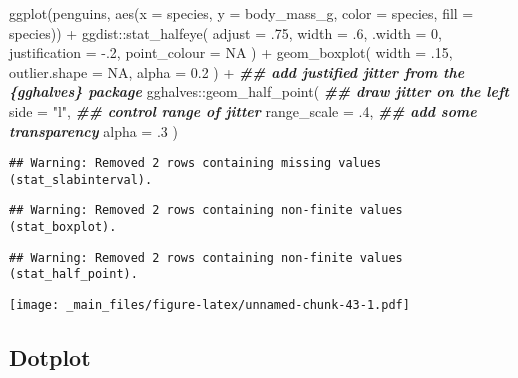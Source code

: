 \documentclass[
]{book}
\newenvironment{Shaded}{\begin{snugshade}}{\end{snugshade}}
\newcommand{\AttributeTok}[1]{\textcolor[rgb]{0.77,0.63,0.00}{#1}}
\newcommand{\ConstantTok}[1]{\textcolor[rgb]{0.00,0.00,0.00}{#1}}
\newcommand{\DecValTok}[1]{\textcolor[rgb]{0.00,0.00,0.81}{#1}}
\newcommand{\DocumentationTok}[1]{\textcolor[rgb]{0.56,0.35,0.01}{\textbf{\textit{#1}}}}
\newcommand{\FloatTok}[1]{\textcolor[rgb]{0.00,0.00,0.81}{#1}}
\newcommand{\FunctionTok}[1]{\textcolor[rgb]{0.00,0.00,0.00}{#1}}
\newcommand{\NormalTok}[1]{#1}
\newcommand{\SpecialCharTok}[1]{\textcolor[rgb]{0.00,0.00,0.00}{#1}}
\newcommand{\StringTok}[1]{\textcolor[rgb]{0.31,0.60,0.02}{#1}}
\begin{document}
\begin{Shaded}
\begin{Highlighting}[]
\FunctionTok{ggplot}\NormalTok{(penguins, }\FunctionTok{aes}\NormalTok{(}\AttributeTok{x =}\NormalTok{ species, }\AttributeTok{y =}\NormalTok{ body\_mass\_g, }\AttributeTok{color =}\NormalTok{ species, }\AttributeTok{fill =}\NormalTok{ species)) }\SpecialCharTok{+} 
\NormalTok{  ggdist}\SpecialCharTok{::}\FunctionTok{stat\_halfeye}\NormalTok{(}
    \AttributeTok{adjust =}\NormalTok{ .}\DecValTok{75}\NormalTok{, }
    \AttributeTok{width =}\NormalTok{ .}\DecValTok{6}\NormalTok{, }
    \AttributeTok{.width =} \DecValTok{0}\NormalTok{, }
    \AttributeTok{justification =} \SpecialCharTok{{-}}\NormalTok{.}\DecValTok{2}\NormalTok{, }
    \AttributeTok{point\_colour =} \ConstantTok{NA}
\NormalTok{  ) }\SpecialCharTok{+} 
  \FunctionTok{geom\_boxplot}\NormalTok{(}
    \AttributeTok{width =}\NormalTok{ .}\DecValTok{15}\NormalTok{, }
    \AttributeTok{outlier.shape =} \ConstantTok{NA}\NormalTok{,}
    \AttributeTok{alpha =} \FloatTok{0.2}
\NormalTok{  ) }\SpecialCharTok{+}
  \DocumentationTok{\#\# add justified jitter from the \{gghalves\} package}
\NormalTok{  gghalves}\SpecialCharTok{::}\FunctionTok{geom\_half\_point}\NormalTok{(}
    \DocumentationTok{\#\# draw jitter on the left}
    \AttributeTok{side =} \StringTok{"l"}\NormalTok{, }
    \DocumentationTok{\#\# control range of jitter}
    \AttributeTok{range\_scale =}\NormalTok{ .}\DecValTok{4}\NormalTok{, }
    \DocumentationTok{\#\# add some transparency}
    \AttributeTok{alpha =}\NormalTok{ .}\DecValTok{3}
\NormalTok{  ) }
\end{Highlighting}
\end{Shaded}

\begin{verbatim}
## Warning: Removed 2 rows containing missing values (stat_slabinterval).
\end{verbatim}

\begin{verbatim}
## Warning: Removed 2 rows containing non-finite values (stat_boxplot).
\end{verbatim}

\begin{verbatim}
## Warning: Removed 2 rows containing non-finite values (stat_half_point).
\end{verbatim}

\texttt{[image: \_main\_files/figure-latex/unnamed-chunk-43-1.pdf]}

\hypertarget{dotplot}{%
\subsection{Dotplot}\label{dotplot}}
\end{document}
